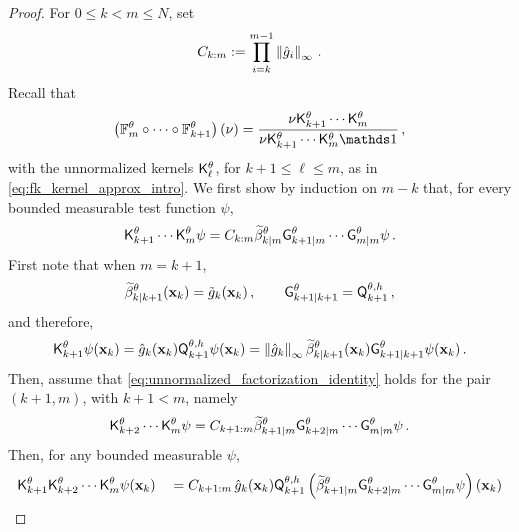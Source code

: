 \documentclass[11pt]{article}
\theoremstyle{plain}
\theoremstyle{definition}
\theoremstyle{remark}
\begin{document}
\begin{proof}
For $0\le k<m\le N$, set
$$
C_{k:m} \eqdef \prod_{i=k}^{m-1}\norminfty{\approxpot{i}} \eqsp.
$$
Recall that
\begin{align*}
\left( \filtertransform{m}*[\theta] \circ \cdots \circ \filtertransform{k+1}*[\theta] \right) \left( \nu \right)
= \frac{ \nu \unpredictive{k+1}[\theta] \cdots \unpredictive{m}[\theta] }{ \nu \unpredictive{ k+1}[\theta] \cdots \unpredictive{m}[\theta] \un  } \eqsp,
\end{align*}
with the unnormalized kernels $\unpredictive{\ell}[\theta]$, for $k+1\leq\ell\leq m$, as in \eqref{eq:fk_kernel_approx_intro}. We first show by induction on $m - k$ that, for every bounded measurable test function $\psi$,
\begin{align} \label{eq:unnormalized_factorization_identity}
\unpredictive{k+1}[\theta] \cdots \unpredictive{m}[\theta] \psi
=
C_{k:m} \normbackwardfun{k}{m}[\theta] \fsmk{k+1}{m}[\theta]\cdots \fsmk{m}{m}[\theta] \psi \eqsp.
\end{align}
First note that when $ m = k +1$,
\begin{align*}
\normbackwardfun{k}{k+1}[\theta](\x_k) = \potnorm{k}(\x_k) \eqsp, \qquad \fsmk{k+1}{k+1}[\theta] = \mk{k+1}[\theta,h] \eqsp,
\end{align*}
and therefore, 
\begin{align*}
\unpredictive{k+1}[\theta] \psi(\x_k)
= \approxpot{k}(\x_k) \mk{k+1}[\theta,h] \psi(\x_k)
= \norminfty{\approxpot{k}} \normbackwardfun{k}{k+1}[\theta](\x_k) \fsmk{k+1}{k+1}[\theta]\psi (\x_k) \eqsp.
\end{align*}
Then, assume that \eqref{eq:unnormalized_factorization_identity} holds for the pair $(k+1,m)$, with $k+1<m$, namely
$$
\unpredictive{k+2}[\theta]\cdots \unpredictive{m}[\theta]\psi
=
C_{k+1:m}\normbackwardfun{k+1}{m}[\theta] \fsmk{k+2}{m}[\theta] \cdots \fsmk{m}{m}[\theta]\psi \eqsp.
$$
Then, for any bounded measurable $\psi$,
\begin{align*} 
\unpredictive{k+1}[\theta]\unpredictive{k+2}[\theta] \cdots \unpredictive{m}[\theta]\psi(\x_k)  
&\quad = C_{k+1:m}\, \approxpot{k}(\x_k) \mk{k+1}[\theta,h] \left( \normbackwardfun{k+1}{m}[\theta] \fsmk{k+2}{m}[\theta]\cdots \fsmk{m}{m}[\theta]\psi \right)(\x_k) \\ 

\end{align*}
\end{proof}
\end{document}
